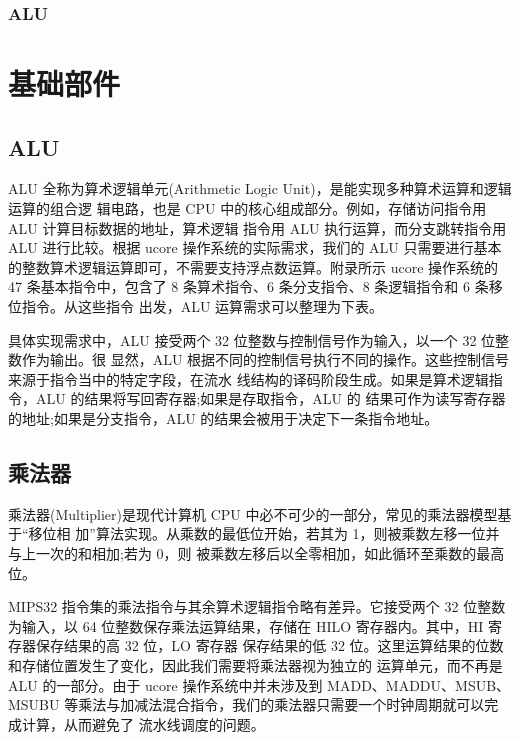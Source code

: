 \documentclass[11pt,utf8]{article}
\begin{document}
\subsubsection{ALU}

\section{基础部件}
\subsection{ALU}
ALU 全称为算术逻辑单元(Arithmetic Logic Unit)，是能实现多种算术运算和逻辑运算的组合逻 辑电路，也是 CPU 中的核心组成部分。例如，存储访问指令用 ALU 计算目标数据的地址，算术逻辑 指令用 ALU 执行运算，而分支跳转指令用 ALU 进行比较。根据 ucore 操作系统的实际需求，我们的 ALU 只需要进行基本的整数算术逻辑运算即可，不需要支持浮点数运算。附录所示 ucore 操作系统的 47 条基本指令中，包含了 8 条算术指令、6 条分支指令、8 条逻辑指令和 6 条移位指令。从这些指令 出发，ALU 运算需求可以整理为下表。

具体实现需求中，ALU 接受两个 32 位整数与控制信号作为输入，以一个 32 位整数作为输出。很 显然，ALU 根据不同的控制信号执行不同的操作。这些控制信号来源于指令当中的特定字段，在流水 线结构的译码阶段生成。如果是算术逻辑指令，ALU 的结果将写回寄存器;如果是存取指令，ALU 的 结果可作为读写寄存器的地址;如果是分支指令，ALU 的结果会被用于决定下一条指令地址。

\subsection{乘法器}
乘法器(Multiplier)是现代计算机 CPU 中必不可少的一部分，常见的乘法器模型基于“移位相
加”算法实现。从乘数的最低位开始，若其为 1，则被乘数左移一位并与上一次的和相加;若为 0，则
被乘数左移后以全零相加，如此循环至乘数的最高位。

MIPS32 指令集的乘法指令与其余算术逻辑指令略有差异。它接受两个 32 位整数为输入，以 64
位整数保存乘法运算结果，存储在 HILO 寄存器内。其中，HI 寄存器保存结果的高 32 位，LO 寄存器 保存结果的低 32 位。这里运算结果的位数和存储位置发生了变化，因此我们需要将乘法器视为独立的 运算单元，而不再是 ALU 的一部分。由于 ucore 操作系统中并未涉及到 MADD、MADDU、MSUB、 MSUBU 等乘法与加减法混合指令，我们的乘法器只需要一个时钟周期就可以完成计算，从而避免了 流水线调度的问题。
\end{document}
